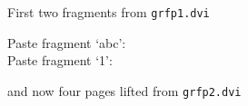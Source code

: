 \documentclass{article}
\begin{document}
First two fragments from \texttt{grfp1.dvi} 
\begin{center}
  Paste fragment `abc': \\
  Paste fragment `1': 
\end{center}
and now four pages lifted from \texttt{grfp2.dvi}
\begin{center}
\end{center}
\end{document}
